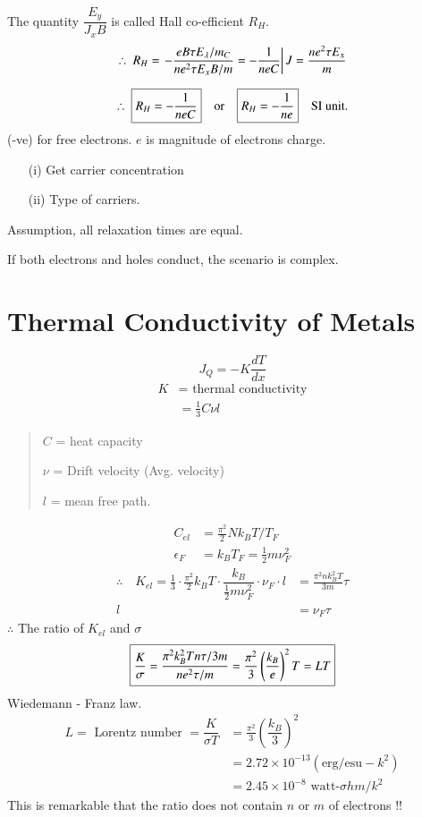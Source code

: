 The quantity $\dfrac{E_{y}}{J_{x}B}$ is called Hall co-efficient $R_{H}$.
\begin{gather*}
\therefore \ R_{H} = \left. -\dfrac{eB\tau E_{\lambda}/m_{C}}{ne^{2}\tau E_{x}B/m}=-\dfrac{1}{neC}\right| J=\dfrac{ne^{2}\tau E_{x}}{m}\\[7pt]
\therefore \ \fbox{$R_{H}=-\dfrac{1}{neC}$}\quad\text{or}\quad \fbox{$R_{H}=-\dfrac{1}{ne}$}\quad \text{SI unit.}
\end{gather*}
(-ve) for free electrons. $e$ is magnitude of electrons charge.
\begin{itemize}
\item[(i)] Get carrier concentration

\item[(ii)] Type of carriers.
\end{itemize}
Assumption, all relaxation times are equal.

If both electrons and holes conduct, the scenario is complex.

\section*{Thermal Conductivity of Metals}
$$
J_{Q}=-K\dfrac{dT}{dx}
$$
\begin{align*}
K &= \text{ thermal conductivity}\\
 &= \frac{1}{3}C\nu l
\end{align*}
\begin{quote}
$C$ = heat capacity

$\nu$ = Drift velocity (Avg. velocity)

$l$ = mean free path.
\end{quote}
\begin{align*}
C_{el} &= \frac{\pi^{2}}{2}Nk_{B}T/T_{F}\\
\epsilon_{F} &= k_{B}T_{F}=\frac{1}{2}m\nu^{2}_{F}
\end{align*}
\begin{align*}
\therefore\quad K_{el}=\frac{1}{3}\cdot \frac{\pi^{2}}{2}k_{B}T\cdot \dfrac{k_{B}}{\frac{1}{2}m\nu^{2}_{F}}\cdot \nu_{F}\cdot l &= \frac{\pi^{2}nk^{2}_{B}T}{3m}\tau\\
l &= \nu_{F}\tau
\end{align*}
$\therefore$ The ratio of $K_{el}$ and $\sigma$
$$
\fbox{$\dfrac{K}{\sigma}=\dfrac{\pi^{2}k^{2}_{B}Tn\tau/3m}{ne^{2}\tau/m}=\dfrac{\pi^{2}}{3}\left(\dfrac{k_{B}}{e}\right)^{2}T=LT$}
$$
Wiedemann - Franz law.
\begin{align*}
L = \text{ Lorentz number } =\dfrac{K}{\sigma T} &= \frac{\pi^{2}}{3}\left(\dfrac{k_{B}}{3}\right)^{2}\\
&= 2.72\times 10^{-13}(\text{erg}/\text{esu}-k^{2})\\
&= 2.45\times 10^{-8}\text{ watt-}\sigma hm/k^{2}
\end{align*}
This is remarkable that the ratio does not contain $n$ or $m$ of electrons !!

